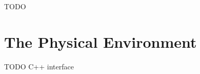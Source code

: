 \ifdraft TODO

\chapter{The Physical Environment}
\label{cha:environment}

TODO C++ interface

\fi


